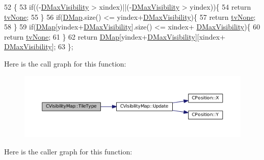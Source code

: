 \begin{DoxyCode}
52                                                               \{
53             \textcolor{keywordflow}{if}((-\hyperlink{classCVisibilityMap_ac8f71b9541c903fce0294d75daa1bbb1}{DMaxVisibility} > xindex)||(-\hyperlink{classCVisibilityMap_ac8f71b9541c903fce0294d75daa1bbb1}{DMaxVisibility} > yindex))\{
54                 \textcolor{keywordflow}{return} \hyperlink{classCVisibilityMap_a6665f905da08825adbb0eee7bd1f2f30aec106086bdc6328c8c6c02ee1bf32d2c}{tvNone};    
55             \}
56             \textcolor{keywordflow}{if}(\hyperlink{classCVisibilityMap_ad217bc34f7a50dd357a3eeeb69cfdd85}{DMap}.size() <= yindex+\hyperlink{classCVisibilityMap_ac8f71b9541c903fce0294d75daa1bbb1}{DMaxVisibility})\{
57                 \textcolor{keywordflow}{return} \hyperlink{classCVisibilityMap_a6665f905da08825adbb0eee7bd1f2f30aec106086bdc6328c8c6c02ee1bf32d2c}{tvNone};   
58             \}
59             \textcolor{keywordflow}{if}(\hyperlink{classCVisibilityMap_ad217bc34f7a50dd357a3eeeb69cfdd85}{DMap}[yindex+\hyperlink{classCVisibilityMap_ac8f71b9541c903fce0294d75daa1bbb1}{DMaxVisibility}].size() <= xindex+
      \hyperlink{classCVisibilityMap_ac8f71b9541c903fce0294d75daa1bbb1}{DMaxVisibility})\{
60                 \textcolor{keywordflow}{return} \hyperlink{classCVisibilityMap_a6665f905da08825adbb0eee7bd1f2f30aec106086bdc6328c8c6c02ee1bf32d2c}{tvNone};   
61             \}
62             \textcolor{keywordflow}{return} \hyperlink{classCVisibilityMap_ad217bc34f7a50dd357a3eeeb69cfdd85}{DMap}[yindex+\hyperlink{classCVisibilityMap_ac8f71b9541c903fce0294d75daa1bbb1}{DMaxVisibility}][xindex+
      \hyperlink{classCVisibilityMap_ac8f71b9541c903fce0294d75daa1bbb1}{DMaxVisibility}];
63         \};
\end{DoxyCode}
Here is the call graph for this function\+:
\nopagebreak
\begin{figure}[H]
\begin{center}
\leavevmode
\includegraphics[width=350pt]{classCVisibilityMap_a8517fe52114dd469093fd1bd13482733_cgraph}
\end{center}
\end{figure}
Here is the caller graph for this function\+:
